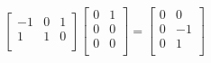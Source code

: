 \documentclass[11pt,a4paper]{report}
\begin{document}
\begin{Ex}
\begin{align*}
\begin{bmatrix}
                                -1 & 0 & 1 \\
                                1 & 1 & 0 \\ \end{bmatrix} \begin{bmatrix} 0 & 1 \\ 0 & 0 \\ 0 & 0 \\ \end{bmatrix} = \begin{bmatrix} 0 & 0 \\
                            0 & -1 \\
                            0 & 1 \\ \end{bmatrix}
            \end{align*}


\end{Ex}
\end{document}
